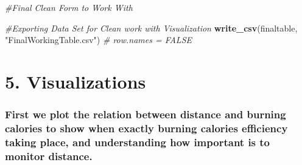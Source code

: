\documentclass[
]{article}
\newenvironment{Shaded}{\begin{snugshade}}{\end{snugshade}}
\newcommand{\CommentTok}[1]{\textcolor[rgb]{0.56,0.35,0.01}{\textit{#1}}}
\newcommand{\FunctionTok}[1]{\textcolor[rgb]{0.13,0.29,0.53}{\textbf{#1}}}
\newcommand{\NormalTok}[1]{#1}
\newcommand{\StringTok}[1]{\textcolor[rgb]{0.31,0.60,0.02}{#1}}
\begin{document}
\begin{Shaded}
\begin{Highlighting}[]
\CommentTok{\#Final Clean Form to Work With}



\CommentTok{\#Exporting Data Set for Clean work with Visualization}
\FunctionTok{write\_csv}\NormalTok{(finaltable, }\StringTok{"FinalWorkingTable.csv"}\NormalTok{)  }\CommentTok{\# row.names = FALSE}
\end{Highlighting}
\end{Shaded}

\section{5. Visualizations}\label{visualizations}

\subsubsection{First we plot the relation between distance and burning
calories to show when exactly burning calories efficiency taking place,
and understanding how important is to monitor
distance.}\label{first-we-plot-the-relation-between-distance-and-burning-calories-to-show-when-exactly-burning-calories-efficiency-taking-place-and-understanding-how-important-is-to-monitor-distance.}
\end{document}
